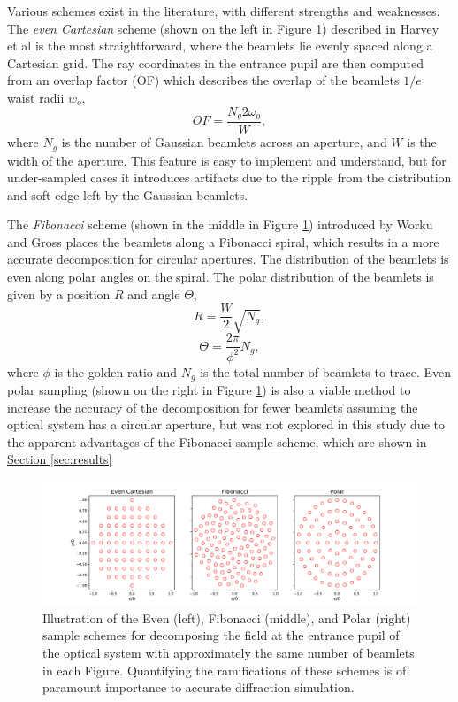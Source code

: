 Various  schemes exist in the literature, with different strengths and weaknesses. The \emph{even Cartesian}  scheme (shown on the left in Figure \ref{fig:sampleschemes}) described in Harvey et al\cite{Harvey15} is the most straightforward, where the beamlets lie evenly spaced along a Cartesian grid. The ray coordinates in the entrance pupil are then computed from an overlap factor (OF) which describes the overlap of the beamlets $1/e$ waist radii $w_o$,
\begin{equation}
    OF = \frac{N_{g} 2 \omega_{o}}{W},
\end{equation}
where $N_{g}$ is the number of Gaussian beamlets across an aperture, and $W$ is the width of the aperture. This feature is easy to implement and understand, but for under-sampled cases it introduces artifacts due to the ripple from the distribution and soft edge left by the Gaussian beamlets. 

The \emph{Fibonacci}  scheme (shown in the middle in Figure \ref{fig:sampleschemes}) introduced by Worku and Gross places the beamlets along a Fibonacci spiral, which results in a more accurate decomposition for circular apertures\cite{Worku:18}. The distribution of the beamlets is even along polar angles on the spiral. The polar distribution of the beamlets is given by a position $R$ and angle $\Theta$,
\begin{equation}
    R = \frac{W}{2}\sqrt{N_{g}},
\end{equation}
\begin{equation}
    \Theta = \frac{2\pi}{\phi^{2}}N_{g},
\end{equation}
where $\phi$ is the golden ratio and $N_{g}$ is the total number of beamlets to trace. Even polar sampling (shown on the right in Figure \ref{fig:sampleschemes}) is also a viable method to increase the accuracy of the decomposition for fewer beamlets assuming the optical system has a circular aperture\cite{Worku:18}, but was not explored in this study due to the apparent advantages of the Fibonacci sample scheme, which are shown in \hyperref[sec:results]{Section \ref{sec:results}} 

\begin{figure}[H]
    \centering
    \includegraphics[width=\textwidth]{sampleschemes.pdf}
    \caption{Illustration of the Even (left), Fibonacci (middle), and Polar (right) sample schemes for decomposing the field at the entrance pupil of the optical system with approximately the same number of beamlets in each Figure. Quantifying the ramifications of these  schemes is of paramount importance to accurate diffraction simulation.}
    \label{fig:sampleschemes}
\end{figure}

